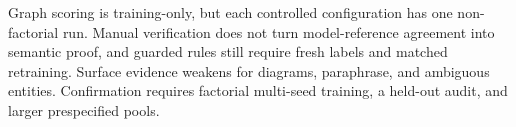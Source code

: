 Graph scoring is training-only, but each controlled configuration has one non-factorial run. Manual verification does not turn model-reference agreement into semantic proof, and guarded rules still require fresh labels and matched retraining. Surface evidence weakens for diagrams, paraphrase, and ambiguous entities. Confirmation requires factorial multi-seed training, a held-out audit, and larger prespecified pools.



% 


